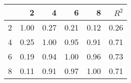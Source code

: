 \begin{tabular}{lrrrrr}
\toprule
{} &     2 &     4 &     6 &     8 &  $R^2$ \\
\midrule
2 &  1.00 &  0.27 &  0.21 &  0.12 &   0.26 \\
4 &  0.25 &  1.00 &  0.95 &  0.91 &   0.71 \\
6 &  0.19 &  0.94 &  1.00 &  0.96 &   0.73 \\
8 &  0.11 &  0.91 &  0.97 &  1.00 &   0.71 \\
\bottomrule
\end{tabular}
